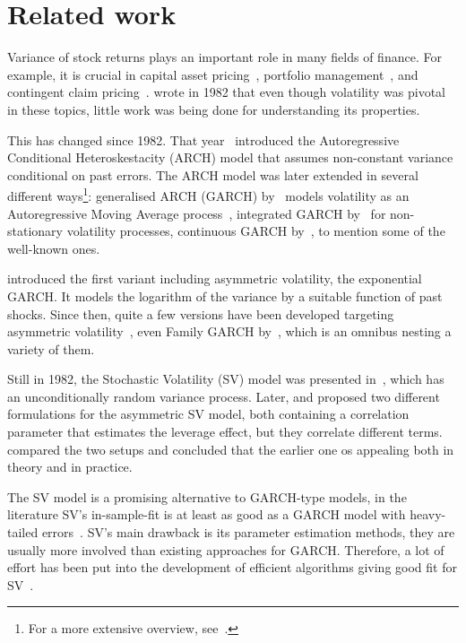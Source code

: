\section{Related work}

Variance of stock returns plays an important role in many fields of finance.
For example, it is crucial in capital asset pricing~\citep{skiadas2009asset}, portfolio management~\citep{chow2014study}, and contingent claim pricing~\citep{hull1987pricing}.
\citeauthor{Christie1982} wrote in 1982 that even though volatility was pivotal in these topics, little work was being done for understanding its properties.

This has changed since 1982.
That year~\citet{Engle1982} introduced the Autoregressive Conditional Heteroskestacity (ARCH) model that assumes non-constant variance conditional on past errors.
The ARCH model was later extended in several different ways\footnote{For a more extensive overview, see~\citet{bollerslev1994arch}.}: generalised ARCH (GARCH) by~\citet{Bollerslev1986} models volatility as an Autoregressive Moving Average process~\citep{box1994time}, integrated GARCH by~\citet{engle1986modelling} for non-stationary volatility processes, continuous GARCH by~\citet{kluppelberg2004continuous}, to mention some of the well-known ones.

\citet{Nelson1991} introduced the first variant including asymmetric volatility, the exponential GARCH.
It models the logarithm of the variance by a suitable function of past shocks.
Since then, quite a few versions have been developed targeting asymmetric volatility~\citep{engle1993measuring,glosten1993relation,zakoian1994threshold,sentana1995quadratic}, even Family GARCH by~\citet{hentschel1995all}, which is an omnibus nesting a variety of them.

Still in 1982, the Stochastic Volatility (SV) model was presented in~\citet{Taylor1982}, which has an unconditionally random variance process.
Later, \citet{harvey1996estimation} and \citet{Jacquier2004} proposed two different formulations for the asymmetric SV model, both containing a correlation parameter that estimates the leverage effect, but they correlate different terms.
~\citet{yu2005leverage} compared the two setups and concluded that the earlier one os appealing both in theory and in practice.

The SV model is a promising alternative to GARCH-type models, in the literature SV's in-sample-fit is at least as good as a GARCH model with heavy-tailed errors~\citet{Kim1998,Chan2016}.
SV's main drawback is its parameter estimation methods, they are usually more involved than existing approaches for GARCH.
Therefore, a lot of effort has been put into the development of efficient algorithms giving good fit for SV~\citep{Kim1998,jacquier2002bayesian,Omori2007,Kastner2014}.

